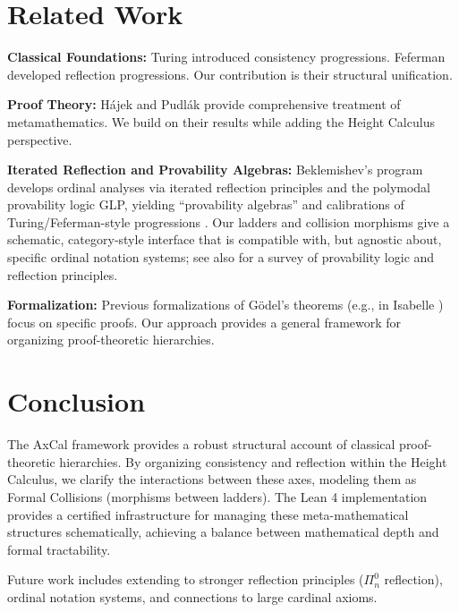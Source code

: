 \documentclass[11pt]{article}
\begin{document}
\section{Related Work}

\textbf{Classical Foundations:} Turing \cite{Turing1939} introduced consistency progressions. Feferman \cite{Feferman1962} developed reflection progressions. Our contribution is their structural unification.

\textbf{Proof Theory:} Hájek and Pudlák \cite{HajekPudlak} provide comprehensive treatment of metamathematics. We build on their results while adding the Height Calculus perspective.

\textbf{Iterated Reflection and Provability Algebras:} Beklemishev’s program develops ordinal analyses via iterated reflection principles and the polymodal provability logic GLP, yielding “provability algebras” and calibrations of Turing/Feferman-style progressions \cite{Beklemishev2003,Beklemishev2004}. Our ladders and collision morphisms give a schematic, category‑style interface that is compatible with, but agnostic about, specific ordinal notation systems; see also \cite{ArtemovBeklemishev2004} for a survey of provability logic and reflection principles.

\textbf{Formalization:} Previous formalizations of Gödel's theorems (e.g., in Isabelle \cite{Paulson}) focus on specific proofs. Our approach provides a general framework for organizing proof-theoretic hierarchies.

\section{Conclusion}
The AxCal framework provides a robust structural account of classical proof-theoretic hierarchies. By organizing consistency and reflection within the Height Calculus, we clarify the interactions between these axes, modeling them as Formal Collisions (morphisms between ladders). The Lean 4 implementation provides a certified infrastructure for managing these meta-mathematical structures schematically, achieving a balance between mathematical depth and formal tractability.

Future work includes extending to stronger reflection principles ($\Pi^0_n$ reflection), ordinal notation systems, and connections to large cardinal axioms.
\end{document}
